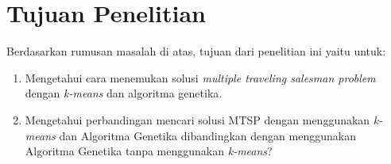\section{Tujuan Penelitian}

Berdasarkan rumusan masalah di atas, tujuan dari penelitian ini yaitu untuk:
\begin{enumerate}
	\item Mengetahui cara menemukan solusi \textit{multiple traveling salesman problem} dengan \textit{k-means} dan algoritma genetika.
	\item Mengetahui perbandingan mencari solusi MTSP dengan menggunakan \textit{k-means} dan Algoritma Genetika dibandingkan dengan menggunakan Algoritma Genetika tanpa menggunakan \textit{k-means}?
\end{enumerate}

